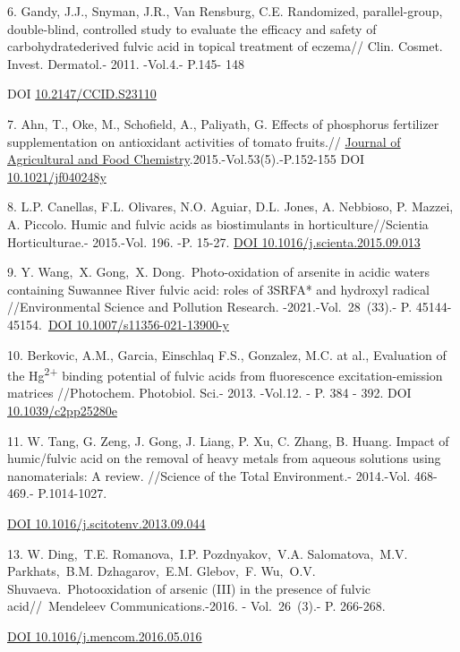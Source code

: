 6. Gandy, J.J., Snyman, J.R., Van Rensburg, C.E. Randomized,
parallel-group, double-blind, controlled study to evaluate the efficacy
and safety of carbohydratederived fulvic acid in topical treatment of
eczema// Clin. Cosmet. Invest. Dermatol.- 2011. -Vol.4.- P.145- 148

DOI \href{https://doi.org/10.2147/ccid.s23110}{10.2147/CCID.S23110}

7. Ahn, T., Oke, M., Schofield, A., Paliyath, G. Effects of phosphorus
fertilizer supplementation on antioxidant activities of tomato fruits.//
\href{https://pubs.acs.org/journal/jafcau?ref=breadcrumb}{Journal of
Agricultural and Food Chemistry}.2015.-Vol.53(5).-P.152-155 DOI
\href{https://doi.org/10.1021/jf040248y}{10.1021/jf040248y}

8. L.P. Canellas, F.L. Olivares, N.O. Aguiar, D.L. Jones, A. Nebbioso,
P. Mazzei, A. Piccolo. Humic and fulvic acids as biostimulants in
horticulture//Scientia Horticulturae.- 2015.-Vol. 196. -P. 15-27.
\href{https://doi.org/10.1016/j.scienta.2015.09.013}{DOI
10.1016/j.scienta.2015.09.013}

9. Y. Wang,~X. Gong,~X. Dong.~Photo-oxidation of arsenite in acidic
waters containing Suwannee River fulvic acid: roles of 3SRFA* and
hydroxyl radical //Environmental Science and Pollution Research.
-2021.-Vol.~28~(33).- P.
45144-45154.~\href{https://doi.org/10.1007/s11356-021-13900-y}{DOI
10.1007/s11356-021-13900-y}

10. Berkovic, A.M., Garcia, Einschlaq F.S., Gonzalez, M.C. at al.,
Evaluation of the Hg\textsuperscript{2+} binding potential of fulvic
acids from fluorescence excitation-emission matrices //Photochem.
Photobiol. Sci.- 2013. -Vol.12. - P. 384 - 392. DOI
\href{https://doi.org/10.1039/c2pp25280e}{10.1039/c2pp25280e}

11. W. Tang, G. Zeng, J. Gong, J. Liang, P. Xu, C. Zhang, B. Huang.
Impact of humic/fulvic acid on the removal of heavy metals from aqueous
solutions using nanomaterials: A review. //Science of the Total
Environment.- 2014.-Vol. 468-469.- P.1014-1027.

\href{https://doi.org/10.1016/j.scitotenv.2013.09.044}{DOI
10.1016/j.scitotenv.2013.09.044}

13. W. Ding,~T.E. Romanova,~I.P. Pozdnyakov,~V.A. Salomatova,~M.V.
Parkhats,~B.M. Dzhagarov,~E.M. Glebov,~F. Wu,~O.V.
Shuvaeva.~Photooxidation of arsenic (III) in the presence of fulvic
acid//~Mendeleev Communications.-2016. - Vol.~26~(3).- P. 266-268.~

\href{https://doi.org/10.1016/j.mencom.2016.05.016}{DOI
10.1016/j.mencom.2016.05.016}

